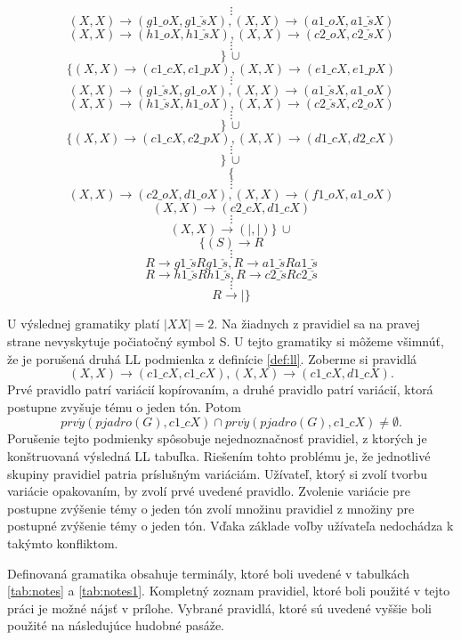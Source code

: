 \begin{definition}
$$\vdots$$
$$(X,X) \rightarrow (g1\_oX, g1\_\check{s}X), (X,X) \rightarrow (a1\_oX, a1\_\check{s}X)$$
$$(X,X) \rightarrow (h1\_oX, h1\_\check{s}X), (X,X) \rightarrow (c2\_oX, c2\_\check{s}X)$$
$$\vdots$$
$$\}\, \cup$$
$$\{(X,X) \rightarrow (c1\_cX, c1\_pX), (X,X) \rightarrow (e1\_cX, e1\_pX)$$
$$\vdots$$
$$(X,X) \rightarrow (g1\_\check{s}X, g1\_oX), (X,X) \rightarrow (a1\_\check{s}X, a1\_oX)$$
$$(X,X) \rightarrow (h1\_\check{s}X, h1\_oX), (X,X) \rightarrow (c2\_\check{s}X, c2\_oX)$$
$$\vdots$$
$$\}\, \cup$$
$$\{(X,X) \rightarrow (c1\_cX, c2\_pX), (X,X) \rightarrow (d1\_cX, d2\_cX)$$
$$\vdots$$
$$\}\, \cup$$
$$\{$$
$$\vdots$$
$$(X,X) \rightarrow (c2\_oX, d1\_oX), (X,X) \rightarrow (f1\_oX, a1\_oX)$$
$$(X,X) \rightarrow (c2\_cX, d1\_cX)$$
$$\vdots$$
$$(X,X) \rightarrow (|, |)\}\, \cup$$
$$\{(S) \rightarrow R$$
$$\vdots$$
$$R \rightarrow g1\_\check{s}Rg1\_\check{s}, R \rightarrow a1\_\check{s}Ra1\_\check{s}$$
$$R \rightarrow h1\_\check{s}Rh1\_\check{s}, R \rightarrow c2\_\check{s}Rc2\_\check{s}$$
$$\vdots$$
$$R \rightarrow |\}$$

U výslednej gramatiky platí $|XX| = 2$. Na žiadnych z pravidiel sa na pravej strane nevyskytuje počiatočný symbol S. U tejto gramatiky si môžeme všimnúť, že je porušená druhá LL podmienka z definície \ref{def:ll}. Zoberme si pravidlá $$(X,X) \rightarrow (c1\_cX, c1\_cX), (X,X) \rightarrow (c1\_cX, d1\_cX).$$ Prvé pravidlo patrí variácií kopírovaním, a druhé pravidlo patrí variácií, ktorá postupne zvyšuje tému o jeden tón. Potom $$prv\acute{y}(pjadro(G),c1\_cX) \cap prv\acute{y}(pjadro(G),c1\_cX) \neq \emptyset.$$ Porušenie tejto podmienky spôsobuje nejednoznačnosť pravidiel, z ktorých je konštruovaná výsledná LL tabuľka. Riešením tohto problému je, že jednotlivé skupiny pravidiel patria príslušným variáciám. Užívateľ, ktorý si zvolí tvorbu variácie opakovaním, by zvolí prvé uvedené pravidlo. Zvolenie variácie pre postupne zvýšenie témy o jeden tón zvolí množinu pravidiel z množiny pre postupné zvýšenie témy o jeden tón. Vďaka základe voľby užívateľa nedochádza k takýmto konfliktom.
\end{definition}

Definovaná gramatika obsahuje terminály, ktoré boli uvedené v tabulkách \ref{tab:notes} a \ref{tab:notes1}. Kompletný zoznam pravidiel, ktoré boli použité v tejto práci je možné nájsť v prílohe. Vybrané pravidlá, ktoré sú uvedené vyššie boli použité na následujúce hudobné pasáže.

